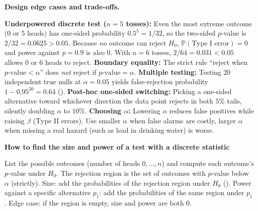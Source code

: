 \documentclass[10pt]{scrartcl}
\newenvironment{howto}[1]{\begin{mdframed}[style=howtostyle]{\color{NavyBlue}\textbf{#1}}\par\vspace{2pt}}{\end{mdframed}}
\begin{document}
\begin{fig}
\end{fig}

\noindent\textbf{Design edge cases and trade-offs.}
\begin{itemize}
  \ii \textbf{Underpowered discrete test ($n=5$ tosses):} Even the most extreme outcome ($0$ or $5$ heads) has one-sided probability $0.5^5 = 1/32$, so the two-sided $p$-value is $2/32 = 0.0625 > 0.05$. Because \emph{no} outcome can reject $H_0$, $\mathbb P(\text{Type I error}) = 0$ and power against $p = 0.9$ is also $0$. With $n = 6$ tosses, $2/64 = 0.031 < 0.05$ allows $0$ or $6$ heads to reject.
  \ii \textbf{Boundary equality:} The strict rule ``reject when $p\text{-value} < \alpha$'' does \emph{not} reject if $p\text{-value} = \alpha$.
  \ii \textbf{Multiple testing:} Testing $20$ independent true nulls at $\alpha = 0.05$ yields false-rejection probability $1 - 0.95^{20} = 0.64$ ().
  \ii \textbf{Post-hoc one-sided switching:} Picking a one-sided alternative toward whichever direction the data point rejects in both $5\%$ tails, silently doubling $\alpha$ to $10\%$.
  \ii \textbf{Choosing $\alpha$:} Lowering $\alpha$ reduces false positives while raising $\beta$ (Type II errors). Use smaller $\alpha$ when false alarms are costly, larger $\alpha$ when missing a real hazard (such as lead in drinking water) is worse.
\end{itemize}

\begin{howto}{How to find the size and power of a test with a discrete statistic}
\begin{steps}
  \ii List the possible outcomes (number of heads $0,\dots,n$) and compute each outcome's $p$-value under $H_0$.
  \ii The rejection region is the set of outcomes with $p$-value below $\alpha$ (strictly).
  \ii Size: add the probabilities of the rejection region under $H_0$ ().
  \ii Power against a specific alternative $p_1$: add the probabilities of the same region under $p_1$.
  \ii Edge case: if the region is empty, size and power are both $0$.
\end{steps}
\end{howto}
\end{document}
